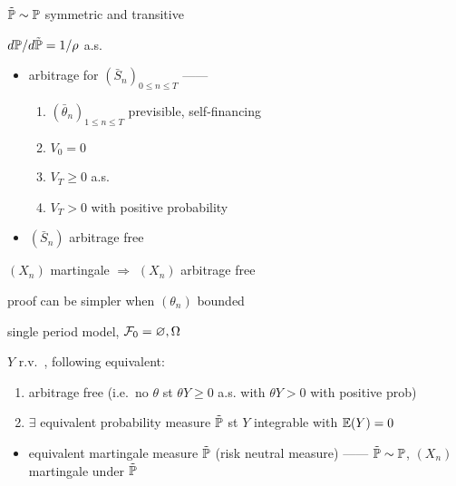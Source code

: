 \begin{fact}
    $\tilde {\mathbb{P}} \sim \mathbb{P}$ symmetric and transitive
\end{fact}

\begin{fact}
    $d\mathbb{P}/d\tilde{\mathbb{P}} = 1/\rho$ a.s.\
\end{fact}

\begin{itemize}
    \item arbitrage for $(\bar S_n)_{0\leq n \leq T}$ ------
    \begin{enumerate}
        \item $(\bar\theta_n)_{1 \leq n \leq T}$ previsible, self-financing
        \item $V_0 = 0$
        \item $V_T \geq 0$ a.s.
        \item $V_T > 0$ with positive probability
    \end{enumerate}
\end{itemize}

\begin{itemize}
    \item $(\bar S_n)$ arbitrage free
\end{itemize}

\begin{prop}
    $(X_n)$ martingale $\Rightarrow$ $(X_n)$ arbitrage free
\end{prop}

\begin{fact}
    proof can be simpler when $(\theta_n)$ bounded
\end{fact}

\begin{setting}
    single period model, $\mathcal{F}_0 = {\varnothing, \Omega}$
\end{setting}

\begin{prop}
    $Y$ r.v.\ , following equivalent:
    \begin{enumerate}
        \item arbitrage free (i.e.\ no $\theta$ st $\theta Y \geq 0$ a.s. with $\theta Y > 0$ with positive prob)
        \item $\exists$ equivalent probability measure $\tilde {\mathbb{P}}$ st $Y$ integrable with $\mathbb{E}(Y) = 0$
    \end{enumerate}
\end{prop}

\begin{itemize}
    \item equivalent martingale measure $\tilde {\mathbb{P}}$ (risk neutral measure) ------ $\tilde {\mathbb{P}} \sim \mathbb{P}$, $(X_n)$ martingale under $\tilde {\mathbb{P}}$
\end{itemize}

